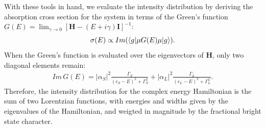 With these tools in hand, we evaluate the intensity distribution by
deriving the absorption cross section for the system in terms of the
Green's function $G(E) = \lim_{\gamma \rightarrow 0} \left [
  \mathbf{H} - (E+i \gamma) \mathbf{I} \right ]^{-1}$:
\begin{equation}
\sigma(E) \propto Im(\mathinner{\langle{g|\mu G(E) \mu|g}\rangle}).
\end{equation}
When the Green's function is evaluated over the eigenvectors of
$\mathbf{H}$, only two diagonal elements remain:
\begin{equation}
  \label{eq:greens-func}
  \begin{split}
    Im \, G(E) =
    \lvert \alpha_{S} \rvert^2
    \frac{\Gamma_{S}}
         {(\epsilon_{S} - E)^2 + \Gamma_{S}^2}
    + \lvert \alpha_{L} \rvert^2
    \frac{\Gamma_{L}}
         {(\epsilon_{L} - E)^2 + \Gamma_{L}^2}. 
  \end{split}
\end{equation}
Therefore, the intensity distribution for the complex energy
Hamiltonian is the sum of two Lorentzian functions, with energies and
widths given by the eigenvalues of the Hamiltonian, and weigted in
magnitude by the fractional bright state character.

